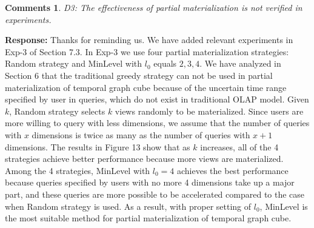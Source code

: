 \documentclass{article}
\newtheorem{Comments}{\textbf{Comments}}
\begin{document}
\begin{Comments}
D3: The effectiveness of partial materialization is not verified in experiments.
\end{Comments}
\noindent \textbf{Response:} Thanks for reminding us. We have added relevant experiments in Exp-3 of Section 7.3. In Exp-3 we use four partial materialization strategies: Random strategy and MinLevel with $ l_0 $ equals $ 2,3,4 $. We have analyzed in Section 6 that the traditional greedy strategy can not be used in partial materialization of temporal graph cube because of the uncertain time range specified by user in queries, which do not exist in traditional OLAP model. Given $ k $, Random strategy selects $ k $ views randomly to be materialized. Since users are more willing to query with less dimensions, we assume that the number of queries with $ x $ dimensions is twice as many as the number of queries with $ x+1 $ dimensions. The results in Figure 13 show that as $ k $ increases, all of the 4 strategies achieve better performance because more views are materialized. Among the 4 strategies, MinLevel with $ l_0=4 $ achieves the best performance because queries specified by users with no more 4 dimensions take up a major part, and these queries are more possible to be accelerated compared to the case when Random strategy is used. As a result, with proper setting of $ l_0 $, MinLevel is the most suitable method for partial materialization of temporal graph cube.
\end{document}
